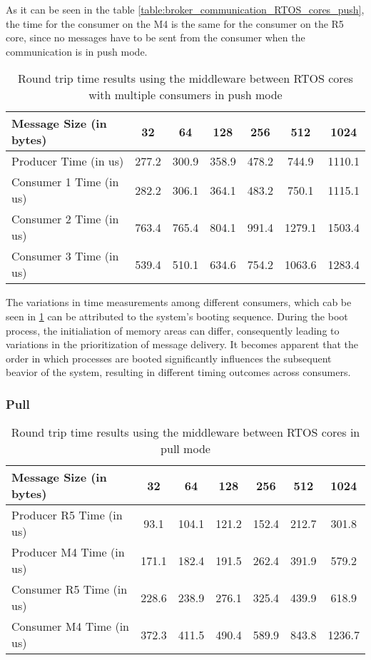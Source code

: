 As it can be seen in the table \ref{table:broker_communication_RTOS_cores_push},
the time for the consumer on the M4 is the same for the consumer on the R5 core,
since no messages have to be sent from the consumer when the communication is
in push mode.

\begin{table}
\centering
\caption{Round trip time results using the middleware between RTOS cores with
         multiple consumers in push mode}
\label{table:broker_communication_RTOS_cores_multiple_consumers_push}
\begin{tabular}{lcccccc}
\toprule
Message Size (in bytes) & 32 & 64 & 128 & 256 & 512 & 1024 \\
\midrule
Producer Time (in us) & 277.2 & 300.9 & 358.9 & 478.2 & 744.9 & 1110.1 \\
Consumer 1 Time (in us) & 282.2 & 306.1 & 364.1 & 483.2 & 750.1 & 1115.1 \\
Consumer 2 Time (in us) & 763.4 & 765.4 & 804.1 & 991.4 & 1279.1 & 1503.4 \\
Consumer 3 Time (in us) & 539.4 & 510.1 & 634.6 & 754.2 & 1063.6 & 1283.4 \\
\bottomrule
\end{tabular}
\end{table}

The variations in time measurements among different consumers, which cab be
seen in \ref{table:broker_communication_RTOS_cores_multiple_consumers_push}
can be attributed to the system's booting sequence.
During the boot process, the initialiation of memory areas can differ,
consequently leading to variations in the prioritization of message delivery.
It becomes apparent that the order in which processes are booted significantly
influences the subsequent beavior of the system, resulting in different timing
outcomes across consumers.

\subsubsection{Pull}

\begin{table}
\centering
\caption{Round trip time results using the middleware between RTOS cores in
         pull mode}
\label{table:broker_communication_RTOS_cores}
\begin{tabular}{lcccccc}
\toprule
Message Size (in bytes) & 32 & 64 & 128 & 256 & 512 & 1024 \\
\midrule
Producer R5 Time (in us) & 93.1 & 104.1 & 121.2 & 152.4 & 212.7 & 301.8 \\
Producer M4 Time (in us) & 171.1 & 182.4 & 191.5 & 262.4 & 391.9 & 579.2 \\
Consumer R5 Time (in us) & 228.6 & 238.9 & 276.1 & 325.4 & 439.9 & 618.9 \\
Consumer M4 Time (in us) & 372.3 & 411.5 & 490.4 & 589.9 & 843.8 & 1236.7 \\
\bottomrule
\end{tabular}
\end{table}

